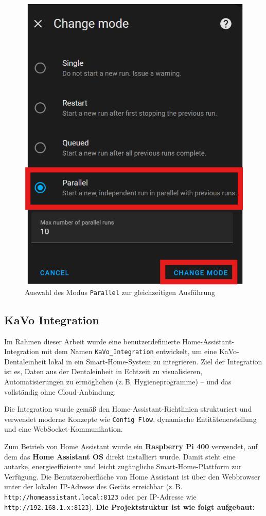 \begin{figure}[H]
    \centering
    \includegraphics[width=0.55\linewidth]{images/changemode2.png}
    \caption{Auswahl des Modus \texttt{Parallel} zur gleichzeitigen Ausführung}
\end{figure}



\subsection{KaVo Integration}

Im Rahmen dieser Arbeit wurde eine benutzerdefinierte Home-Assistant-Integration mit dem Namen \texttt{KaVo\_Integration} entwickelt, um eine KaVo-Dentaleinheit lokal in ein Smart-Home-System zu integrieren. Ziel der Integration ist es, Daten aus der Dentaleinheit in Echtzeit zu visualisieren, Automatisierungen zu ermöglichen (z.\,B. Hygieneprogramme) – und das vollständig ohne Cloud-Anbindung.

Die Integration wurde gemäß den Home-Assistant-Richtlinien strukturiert und verwendet moderne Konzepte wie \texttt{Config Flow}, dynamische Entitätenerstellung und eine WebSocket-Kommunikation. 

Zum Betrieb von Home Assistant wurde ein \textbf{Raspberry Pi 400} verwendet, auf dem das \textbf{Home Assistant OS} direkt installiert wurde. Damit steht eine autarke, energieeffiziente und leicht zugängliche Smart-Home-Plattform zur Verfügung. Die Benutzeroberfläche von Home Assistant ist über den Webbrowser unter der lokalen IP-Adresse des Geräts erreichbar (z.\,B. \texttt{http://homeassistant.local:8123} oder per IP-Adresse wie \texttt{http://192.168.1.x:8123}).
\newpage
\textbf{Die Projektstruktur ist wie folgt aufgebaut:}

